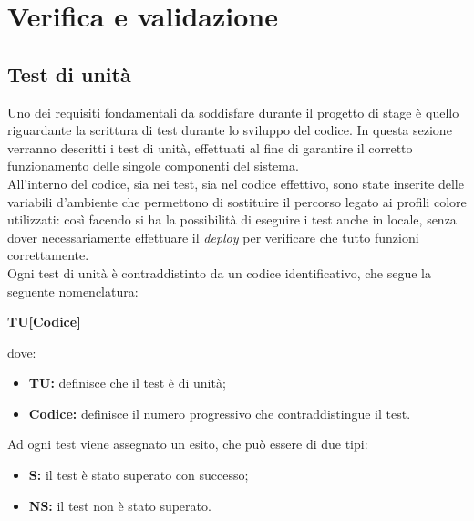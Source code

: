 \chapter{Verifica e validazione}
\label{cap:verifica-validazione}


\section{Test di unità}

Uno dei requisiti fondamentali da soddisfare durante il progetto di stage è
quello riguardante la scrittura di test durante lo sviluppo del codice. In
questa sezione verranno descritti i test di unità, effettuati al fine di garantire il corretto
funzionamento delle singole componenti del sistema. \\
All'interno del codice, sia nei test, sia nel codice effettivo, sono state
inserite delle variabili d'ambiente che permettono di sostituire il percorso
legato ai profili colore utilizzati: così facendo si ha la possibilità di
eseguire i test anche in locale, senza dover necessariamente effettuare il
\emph{deploy} per verificare che tutto funzioni correttamente.\\
Ogni test di unità è contraddistinto da un codice identificativo, che segue la
seguente nomenclatura: \\
\begin{center}
    \textbf{TU[Codice]}
\end{center}
dove:
\begin{itemize}
    \item \textbf{TU:} definisce che il test è di unità;
    \item \textbf{Codice:} definisce il numero progressivo che contraddistingue il test.
\end{itemize}

Ad ogni test viene assegnato un esito, che può essere di due tipi:
\begin{itemize}
    \item \textbf{S:} il test è stato superato con successo;
    \item \textbf{NS:} il test non è stato superato.
\end{itemize}

